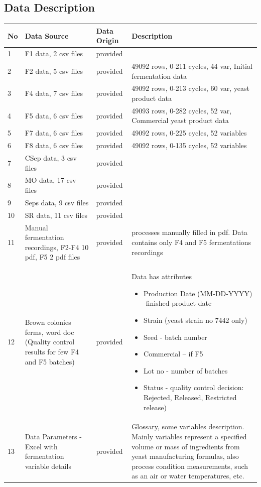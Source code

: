 \begin{landscape}
\section{Data Description}
\begin{center}
\begin{longtable}{l | p{5cm} | p{1.5cm} | p{10cm}}
\label{tab:data}
No & Data Source &	Data Origin	& Description \\
\hline
1 &	F1 data, 2 csv files	& provided & \\
2 &	F2 data,  5 csv files	& provided &	49092 rows, 0-211 cycles, 44 var, Initial fermentation data \\
3 & F4 data, 7 csv files	& provided &	49092 rows, 0-213 cycles, 60 var, yeast product data \\
4 &	F5 data, 6 csv files	& provided &	49093 rows, 0-282 cycles, 52 var, Commercial yeast product data \\
5 &	F7 data, 6 csv files	& provided &	49092 rows, 0-225 cycles, 52 variables \\
6 &	F8 data, 6 csv files	& provided &	49092 rows, 0-135 cycles, 52 variables\\
7 & CSep data, 3 csv files	&provided \\	
8 &	MO data, 17 csv files	&provided \\	
9 &	Seps data, 9 csv files	&provided \\	
10&	SR data, 11 csv files	&provided \\
11&	Manual fermentation recordings,  
F2-F4 10 pdf, F5 2 pdf files&	provided&	processes manually filled in pdf. Data contains only F4 and F5 fermentations recordings  \\
12&	Brown colonies ferms, word doc
(Quality control results for few F4 and F5 batches)	&provided&	Data has attributes
\begin{itemize}
    \item Production Date (MM-DD-YYYY) -finished product date
    \item Strain (yeast strain no 7442 only)
    \item Seed - batch number
    \item Commercial – if F5
    \item Lot no - number of batches
    \item 	Status - quality control decision: Rejected, Released, Restricted release)
\end{itemize} \\
13&	Data Parameters - Excel with fermentation variable details  	&provided&Glossary, some variables description. Mainly variables represent a specified volume or mass of ingredients from yeast manufacturing formulas, also process condition measurements, such as an air or water temperatures, etc.\\


\end{longtable}
\end{center}
\end{landscape}
